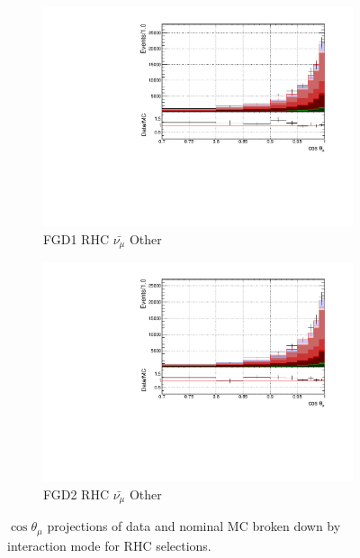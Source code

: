 \begin{figure}[!htbp]
\begin{subfigure}{0.49\textwidth}
  \centering
  \includegraphics[width=\textwidth]{figs/FGD1_anti-numuCC_other_t}
  \caption{FGD1 RHC $\bar{\nu_{\mu}}$ Other}
\end{subfigure}
\begin{subfigure}{0.49\textwidth}
  \centering
  \includegraphics[width=\textwidth]{figs/FGD2_anti-numuCC_other_t}
  \caption{FGD2 RHC $\bar{\nu_{\mu}}$ Other}
\end{subfigure}
\caption{$\cos\theta_{\mu}$ projections of data and nominal MC broken down by interaction mode for RHC \numub selections.}
\label{fig:tstack_rhc_numub}
\end{figure}

